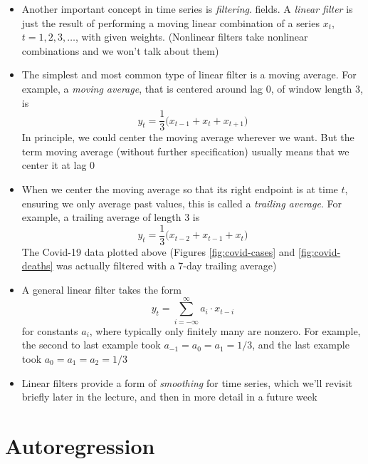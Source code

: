 \documentclass{article}
\begin{document}
\begin{itemize}
\item Another important concept in time series is \emph{filtering}. 
  fields. A \emph{linear filter} is just the result of performing a moving 
  linear combination of a series $x_t$, $t = 1,2,3,\dots$, with given
  weights. (Nonlinear filters take nonlinear combinations and we won't talk
  about them)

\item The simplest and most common type of linear filter is a moving
  average. For example, a \emph{moving average}, that is centered around lag 0,
  of window length 3, is 
  \[
  y_t = \frac{1}{3} \Big( x_{t-1} + x_t + x_{t+1} \Big)
  \]
  In principle, we could center the moving average wherever we want. But the
  term moving average (without further specification) usually means that we
  center it at lag 0

\item When we center the moving average so that its right endpoint is at time
  $t$, ensuring we only average past values, this is called a \emph{trailing
    average}. For example, a trailing average of length 3 is    
  \[
  y_t = \frac{1}{3} \Big( x_{t-2} + x_{t-1} + x_t \Big) 
  \]
  The Covid-19 data plotted above (Figures \ref{fig:covid-cases} and
  \ref{fig:covid-deaths} was actually filtered with a 7-day trailing average)

\item A general linear filter takes the form
  \[
  y_t = \sum_{i=-\infty}^\infty a_i \cdot x_{t-i}
  \]
  for constants $a_i$, where typically only finitely many are nonzero. For
  example, the second to last example took $a_{-1} = a_0 = a_1 = 1/3$, and the
  last example took $a_0 = a_1 = a_2 = 1/3$

\item Linear filters provide a form of \emph{smoothing} for time series, which
  we'll revisit briefly later in the lecture, and then in more detail in a
  future week  
\end{itemize}

\section{Autoregression}
\end{document}
